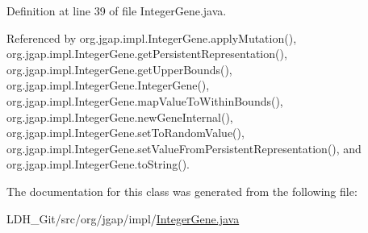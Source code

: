 Definition at line 39 of file Integer\-Gene.\-java.



Referenced by org.\-jgap.\-impl.\-Integer\-Gene.\-apply\-Mutation(), org.\-jgap.\-impl.\-Integer\-Gene.\-get\-Persistent\-Representation(), org.\-jgap.\-impl.\-Integer\-Gene.\-get\-Upper\-Bounds(), org.\-jgap.\-impl.\-Integer\-Gene.\-Integer\-Gene(), org.\-jgap.\-impl.\-Integer\-Gene.\-map\-Value\-To\-Within\-Bounds(), org.\-jgap.\-impl.\-Integer\-Gene.\-new\-Gene\-Internal(), org.\-jgap.\-impl.\-Integer\-Gene.\-set\-To\-Random\-Value(), org.\-jgap.\-impl.\-Integer\-Gene.\-set\-Value\-From\-Persistent\-Representation(), and org.\-jgap.\-impl.\-Integer\-Gene.\-to\-String().



The documentation for this class was generated from the following file\-:\begin{DoxyCompactItemize}
\item 
L\-D\-H\-\_\-\-Git/src/org/jgap/impl/\hyperlink{_integer_gene_8java}{Integer\-Gene.\-java}\end{DoxyCompactItemize}
